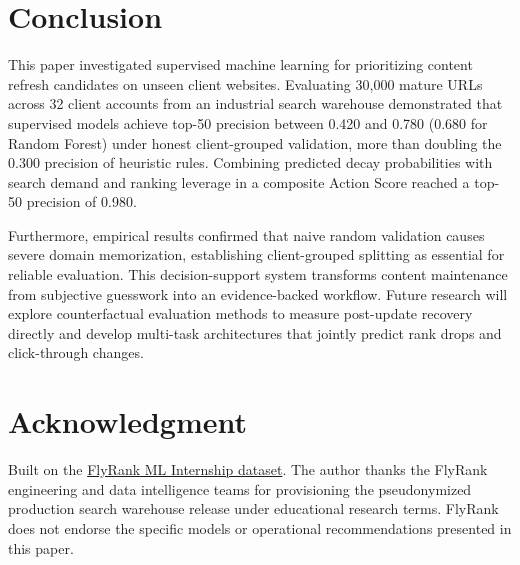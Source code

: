 \documentclass[conference]{IEEEtran}
\begin{document}
\section{Conclusion}
This paper investigated supervised machine learning for prioritizing content refresh candidates on unseen client websites. Evaluating 30,000 mature URLs across 32 client accounts from an industrial search warehouse demonstrated that supervised models achieve top-50 precision between 0.420 and 0.780 (0.680 for Random Forest) under honest client-grouped validation, more than doubling the 0.300 precision of heuristic rules. Combining predicted decay probabilities with search demand and ranking leverage in a composite Action Score reached a top-50 precision of 0.980.

Furthermore, empirical results confirmed that naive random validation causes severe domain memorization, establishing client-grouped splitting as essential for reliable evaluation. This decision-support system transforms content maintenance from subjective guesswork into an evidence-backed workflow. Future research will explore counterfactual evaluation methods to measure post-update recovery directly and develop multi-task architectures that jointly predict rank drops and click-through changes.

\section*{Acknowledgment}
Built on the \href{https://flyrank.ai/}{FlyRank ML Internship dataset}.
The author thanks the FlyRank engineering and data intelligence teams for provisioning the pseudonymized production search warehouse release under educational research terms. FlyRank does not endorse the specific models or operational recommendations presented in this paper.



\end{document}
